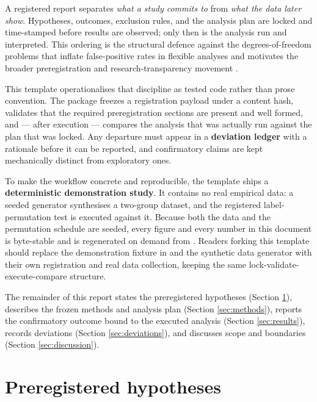 \documentclass[
]{article}
\begin{document}
A registered report separates \emph{what a study commits to} from
\emph{what the data later show}. Hypotheses, outcomes, exclusion rules,
and the analysis plan are locked and time-stamped before results are
observed; only then is the analysis run and interpreted. This ordering
is the structural defence against the degrees-of-freedom problems that
inflate false-positive rates in flexible analyses
\citep{simmons2011false} and motivates the broader preregistration and
research-transparency movement
\citep{nosek2018preregistration, munafo2017manifesto, chambers2013registered}.

This template operationalises that discipline as tested code rather than
prose convention. The  package freezes a
registration payload under a content hash, validates that the required
preregistration sections are present and well formed, and --- after
execution --- compares the analysis that was actually run against the
plan that was locked. Any departure must appear in a \textbf{deviation
ledger} with a rationale before it can be reported, and confirmatory
claims are kept mechanically distinct from exploratory ones.

To make the workflow concrete and reproducible, the template ships a
\textbf{deterministic demonstration study}. It contains no real
empirical data: a seeded generator synthesises a two-group dataset, and
the registered label-permutation test is executed against it. Because
both the data and the permutation schedule are seeded, every figure and
every number in this document is byte-stable and is regenerated on
demand from . Readers forking this
template should replace the demonstration fixture in
 and the synthetic data
generator with their own registration and real data collection, keeping
the same lock-validate-execute-compare structure.

The remainder of this report states the preregistered hypotheses
(Section \ref{sec:hypotheses}), describes the frozen methods and
analysis plan (Section \ref{sec:methods}), reports the confirmatory
outcome bound to the executed analysis (Section \ref{sec:results}),
records deviations (Section \ref{sec:deviations}), and discusses scope
and boundaries (Section \ref{sec:discussion}).

\newpage

\section{Preregistered hypotheses}\label{sec:hypotheses}
\end{document}
